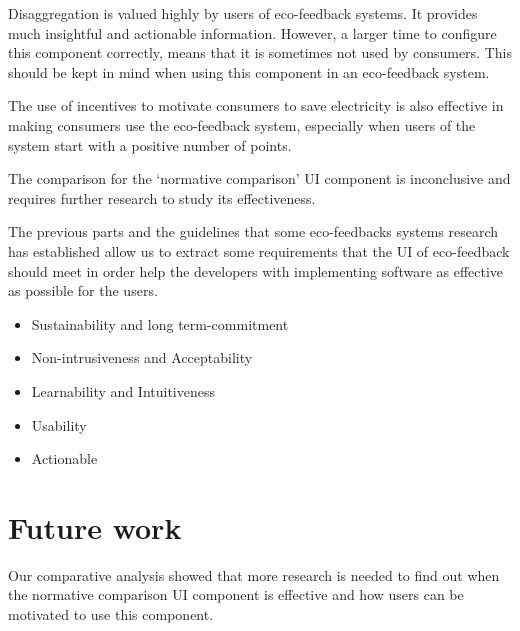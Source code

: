 \documentclass[journal]{vgtc}                %
\begin{document}
Disaggregation is valued highly by users of eco-feedback systems. It provides much insightful and actionable information. However, a larger time to configure this component correctly, means that it is sometimes not used by consumers. This should be kept in mind when using this component in an eco-feedback system.

The use of incentives to motivate consumers to save electricity is also effective in making consumers use the eco-feedback system, especially when users of the system start with a positive number of points.

The comparison for the `normative comparison'  UI component is inconclusive and requires further research to study its effectiveness.

The previous parts and the guidelines that some eco-feedbacks systems research has established \cite{karjalainen2011consumer} allow us to extract some requirements that the UI of eco-feedback should meet in order help the developers with implementing software as effective as possible for the users. \\ %
\begin{itemize}
\item Sustainability and long term-commitment
\item Non-intrusiveness and Acceptability
\item Learnability and Intuitiveness
\item Usability
\item Actionable
\end{itemize}



\section{Future work}
Our comparative analysis showed that more research is needed to find out when the normative comparison UI component is effective and how users can be motivated to use this component.
\end{document}
